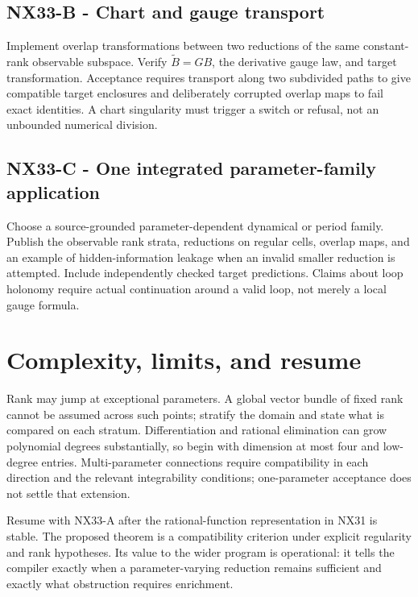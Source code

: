 \documentclass[
  11pt,
  a4paper,
]{report}
\begin{document}
\hypertarget{nx33-b---chart-and-gauge-transport}{%
\subsection{NX33-B - Chart and gauge
transport}\label{nx33-b---chart-and-gauge-transport}}

Implement overlap transformations between two reductions of the same
constant-rank observable subspace. Verify \(\widetilde B=GB\), the
derivative gauge law, and target transformation. Acceptance requires
transport along two subdivided paths to give compatible target
enclosures and deliberately corrupted overlap maps to fail exact
identities. A chart singularity must trigger a switch or refusal, not an
unbounded numerical division.

\hypertarget{nx33-c---one-integrated-parameter-family-application}{%
\subsection{NX33-C - One integrated parameter-family
application}\label{nx33-c---one-integrated-parameter-family-application}}

Choose a source-grounded parameter-dependent dynamical or period family.
Publish the observable rank strata, reductions on regular cells, overlap
maps, and an example of hidden-information leakage when an invalid
smaller reduction is attempted. Include independently checked target
predictions. Claims about loop holonomy require actual continuation
around a valid loop, not merely a local gauge formula.

\hypertarget{complexity-limits-and-resume}{%
\section{Complexity, limits, and
resume}\label{complexity-limits-and-resume}}

Rank may jump at exceptional parameters. A global vector bundle of fixed
rank cannot be assumed across such points; stratify the domain and state
what is compared on each stratum. Differentiation and rational
elimination can grow polynomial degrees substantially, so begin with
dimension at most four and low-degree entries. Multi-parameter
connections require compatibility in each direction and the relevant
integrability conditions; one-parameter acceptance does not settle that
extension.

Resume with NX33-A after the rational-function representation in NX31 is
stable. The proposed theorem is a compatibility criterion under explicit
regularity and rank hypotheses. Its value to the wider program is
operational: it tells the compiler exactly when a parameter-varying
reduction remains sufficient and exactly what obstruction requires
enrichment.
\end{document}
